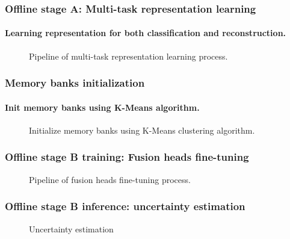 \documentclass[aspectratio=169]{beamer}
\begin{document}
%     

\begin{frame}
    \frametitle{Offline stage A: Multi-task representation learning}
    \framesubtitle{Learning representation for both classification and reconstruction.}
    \begin{figure}[H]
    \centering
    
    \caption[Offline stage A pipeline] {Pipeline of multi-task representation learning process.}
    \label{fig:offline-stage-A}
    \end{figure}
\end{frame}

\begin{frame}
    \frametitle{Memory banks initialization}
    \framesubtitle{Init memory banks using K-Means algorithm.}
    \begin{figure}
        \centering
        
        \caption{Initialize memory banks using K-Means clustering algorithm.}
        \label{fig:banks-init}
    \end{figure}
\end{frame}

\begin{frame}
    \frametitle{Offline stage B training: Fusion heads fine-tuning}
    \begin{figure}[H]
    \centering
    
    \caption[Fusion heads fine-tuning pipeline] {Pipeline of fusion heads fine-tuning process.}
    \label{fig:offline-stage-B}
    \end{figure}
\end{frame}

\begin{frame}
    \frametitle{Offline stage B inference: uncertainty estimation}
    \begin{figure}
        \centering
        
        \caption[Uncertainty estimation] {Uncertainty estimation}
        \label{fig:uncertainty-estimation}
    \end{figure}
\end{frame}
\end{document}
